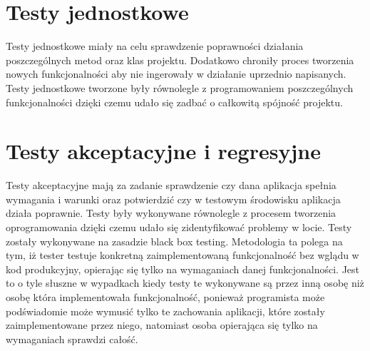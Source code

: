 \documentclass{BscUS}
\begin{document}
\section{Testy jednostkowe}
\indent Testy jednostkowe miały na celu sprawdzenie poprawności działania poszczególnych metod oraz klas projektu. Dodatkowo chroniły proces tworzenia nowych funkcjonalności aby nie ingerowały w działanie uprzednio napisanych. Testy jednostkowe tworzone były równolegle z programowaniem poszczególnych funkcjonalności dzięki czemu udało się zadbać o całkowitą spójność projektu.
\section{Testy akceptacyjne i regresyjne}
\indent Testy akceptacyjne mają za zadanie sprawdzenie czy dana aplikacja spełnia wymagania i warunki oraz potwierdzić czy w testowym środowisku aplikacja działa poprawnie. Testy były wykonywane równolegle z procesem tworzenia oprogramowania dzięki czemu udało się zidentyfikować problemy w locie. Testy zostały wykonywane na zasadzie black box testing. Metodologia ta polega na tym, iż tester testuje konkretną zaimplementowaną funkcjonalność bez wglądu w kod produkcyjny, opierając się tylko na wymaganiach danej funkcjonalności. Jest to o tyle słuszne w wypadkach kiedy testy te wykonywane są przez inną osobę niż osobę która implementowała funkcjonalność, ponieważ programista może podświadomie może wymusić tylko te zachowania aplikacji, które zostały zaimplementowane przez niego, natomiast osoba opierająca się tylko na wymaganiach sprawdzi całość.
\end{document}
